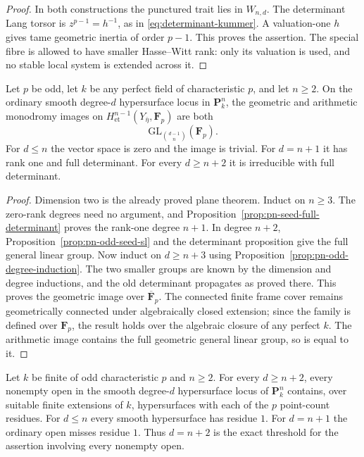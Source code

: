 \begin{proof}
In both constructions the punctured trait lies in $W_{n,d}$.
The determinant Lang torsor is
$z^{p-1}=h^{-1}$, as in \eqref{eq:determinant-kummer}.
A valuation-one $h$ gives tame geometric inertia of order
$p-1$.  This proves the assertion.  The special fibre is
allowed to have smaller Hasse--Witt rank: only its valuation
is used, and no stable local system is extended across it.
\end{proof}

\begin{theorem}\label{thm:pn-odd-full-groups}
Let $p$ be odd, let $k$ be any perfect field of characteristic
$p$, and let $n\geq2$.  On the ordinary smooth degree-$d$
hypersurface locus in $\mathbf P^n_k$, the geometric and
arithmetic monodromy images on
$H^{n-1}_{\mathrm{et}}(Y_{\bar\eta},\mathbf F_p)$ are both
\[
 \mathrm{GL}_{\binom{d-1}{n}}(\mathbf F_p).
\]
For $d\leq n$ the vector space is zero and the image is trivial.
For $d=n+1$ it has rank one and full determinant.
For every $d\geq n+2$ it is irreducible with full determinant.
\end{theorem}

\begin{proof}
Dimension two is the already proved plane theorem.
Induct on $n\geq3$.  The zero-rank degrees need no argument,
and Proposition~\ref{prop:pn-seed-full-determinant} proves the
rank-one degree $n+1$.  In degree $n+2$,
Proposition~\ref{prop:pn-odd-seed-sl} and the determinant
proposition give the full general linear group.
Now induct on $d\geq n+3$ using
Proposition~\ref{prop:pn-odd-degree-induction}.
The two smaller groups are known by the dimension and degree
inductions, and the old determinant propagates as proved there.
This proves the geometric image over $\overline{\mathbf F}_p$.
The connected finite frame cover remains geometrically
connected under algebraically closed extension; since the
family is defined over $\mathbf F_p$, the result holds over
the algebraic closure of any perfect $k$.  The arithmetic
image contains the full geometric general linear group, so
is equal to it.
\end{proof}

\begin{corollary}\label{cor:pn-odd-all-residues-sharp}
Let $k$ be finite of odd characteristic $p$ and $n\geq2$.
For every $d\geq n+2$, every nonempty open in the smooth
degree-$d$ hypersurface locus of $\mathbf P^n_k$ contains,
over suitable finite extensions of $k$, hypersurfaces with
each of the $p$ point-count residues.
For $d\leq n$ every smooth hypersurface has residue $1$.
For $d=n+1$ the ordinary open misses residue $1$.
Thus $d=n+2$ is the exact threshold for the assertion involving
every nonempty open.
\end{corollary}

